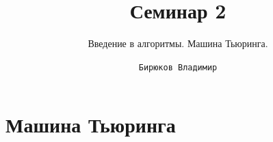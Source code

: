 \documentclass[newPxFont]{beamer}
\title{Семинар 2}
\subtitle{Введение в алгоритмы. Машина Тьюринга.}
\author{\texttt{Бирюков Владимир}}
\institute{МФТИ}
\begin{document}
%
%

\maketitle


%
%

\section{Машина Тьюринга}

\end{document}
